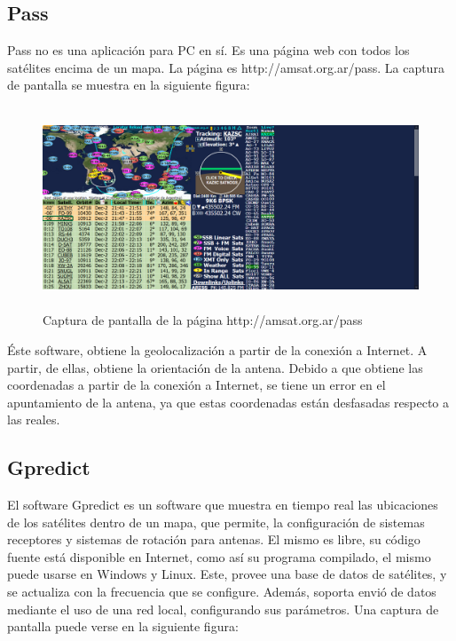 \subsection{Pass}
Pass no es una aplicación para PC en sí. Es una página web con todos los satélites encima de un mapa. La página es http://amsat.org.ar/pass. La captura de pantalla se muestra en la siguiente figura:%
\begin{figure}[ht]
	\centering
	\includegraphics[width=\linewidth, height= 6cm]{pass}
	\caption{Captura de pantalla de la página http://amsat.org.ar/pass }
	\label{fig:iu_pass}
\end{figure}

Éste software, obtiene la geolocalización a partir de la conexión a Internet. A partir, de ellas, obtiene la orientación de la antena. Debido a que obtiene las coordenadas a partir de la conexión a Internet, se tiene un error en el apuntamiento de la antena, ya que estas coordenadas están desfasadas respecto a las reales.    

\subsection{Gpredict}

El software Gpredict es un software que muestra en tiempo real las ubicaciones de los satélites dentro de un mapa, que permite, la configuración de sistemas receptores y sistemas de rotación para antenas. El mismo es libre, su código fuente está disponible en Internet, como así su programa compilado, el mismo puede usarse en Windows y Linux. Este, provee una base de datos de satélites, y se actualiza con la frecuencia que se configure. Además, soporta envió de datos mediante el uso de una red local, configurando sus parámetros. Una captura de pantalla puede verse en la siguiente figura:  %

